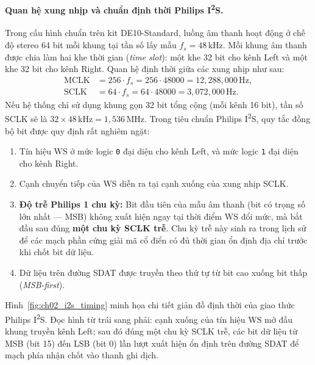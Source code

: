 \paragraph{Quan hệ xung nhịp và chuẩn định thời Philips I\textsuperscript{2}S.}
Trong cấu hình chuẩn trên kit DE10-Standard, luồng âm thanh hoạt động ở chế độ stereo 64 bit mỗi khung tại tần số lấy mẫu $f_s = 48\,\text{kHz}$. Mỗi khung âm thanh được chia làm hai khe thời gian (\emph{time slot}): một khe 32 bit cho kênh Left và một khe 32 bit cho kênh Right. Quan hệ định thời giữa các xung nhịp như sau:
\begin{align}
\text{MCLK} &= 256\cdot f_s = 256\cdot 48000 = 12{,}288{,}000\,\text{Hz},\\
\text{SCLK} &= 64\cdot f_s = 64\cdot 48000 = 3{,}072{,}000\,\text{Hz}.
\end{align}
Nếu hệ thống chỉ sử dụng khung gọn 32 bit tổng cộng (mỗi kênh 16 bit), tần số SCLK sẽ là $32 \times 48\,\text{kHz} = 1{,}536\,\text{MHz}$. Trong tiêu chuẩn Philips I\textsuperscript{2}S, quy tắc đồng bộ bit được quy định rất nghiêm ngặt:
\begin{enumerate}
    \item Tín hiệu WS ở mức logic \texttt{0} đại diện cho kênh Left, và mức logic \texttt{1} đại diện cho kênh Right.
    \item Cạnh chuyển tiếp của WS diễn ra tại cạnh xuống của xung nhịp SCLK.
    \item \textbf{Độ trễ Philips 1 chu kỳ:} Bit đầu tiên của mẫu âm thanh (bit có trọng số lớn nhất --- MSB) không xuất hiện ngay tại thời điểm WS đổi mức, mà bắt đầu sau đúng \textbf{một chu kỳ SCLK trễ}. Chu kỳ trễ này sinh ra trong lịch sử để các mạch phần cứng giải mã cổ điển có đủ thời gian ổn định địa chỉ trước khi chốt bit dữ liệu.
    \item Dữ liệu trên đường SDAT được truyền theo thứ tự từ bit cao xuống bit thấp (\emph{MSB-first}).
\end{enumerate}

Hình~\ref{fig:ch02_i2s_timing} minh họa chi tiết giản đồ định thời của giao thức Philips I\textsuperscript{2}S. Đọc hình từ trái sang phải: cạnh xuống của tín hiệu WS mở đầu khung truyền kênh Left; sau đó đúng một chu kỳ SCLK trễ, các bit dữ liệu từ MSB (bit 15) đến LSB (bit 0) lần lượt xuất hiện ổn định trên đường SDAT để mạch phía nhận chốt vào thanh ghi dịch.

